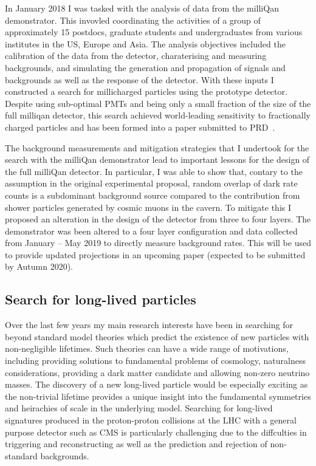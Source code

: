 \documentclass[11pt]{article}
\theoremstyle{plain} \numberwithin{equation}{section}
\theoremstyle{definition}
\begin{document}
In January 2018 I was tasked with the analysis of data from the 
milliQan demonstrator. This invovled coordinating the activities of a group of approximately
15 postdocs, graduate students and undergraduates from various institutes in the US, Europe and Asia. 
The analysis objectives included the calibration of the data from the detector,
charaterising and measuring backgrounds, and simulating the generation and propagation of 
signals and backgrounds as well as the response of the detector. With these inputs I constructed
a search for millicharged particles using the prototype detector. Despite using sub-optimal PMTs 
and being only a small fraction of the size of the full milliqan detector,
this search achieved world-leading sensitivity to fractionally charged particles and has been formed
into a paper submitted to PRD~\cite{XX}.

The background measurements and mitigation strategies that I undertook for the search
with the milliQan demonstrator lead to important lessons for the design 
of the full milliQan detector. In particular, I was able to show 
that, contary to the assumption in the original experimental proposal, random overlap of dark rate counts
is a subdominant background source compared to the contribution from shower particles generated
by cosmic muons in the cavern. To mitigate this I proposed an alteration in the design of the detector from
three to four layers. The demonstrator was been altered to a four layer configuration and data collected from 
January -- May 2019 to directly measure background rates. This will be used to provide updated
projections in an upcoming paper (expected to be submitted by Autumn 2020).

\subsection*{Search for long-lived particles}

Over the last few years my main research interests have been in searching for 
beyond standard model theories which predict the existence of new particles
with non-negligible lifetimes. Such theories can have a wide range of motivations, 
including providing solutions to fundamental problems of cosmology, naturalness considerations,
providing a dark matter candidate and allowing non-zero neutrino masses. The discovery
of a new long-lived particle would be especially exciting as the non-trivial lifetime
provides a unique insight into the fundamental symmetries and heirachies of scale in the underlying model.
Searching for long-lived signatures produced in the proton-proton collisions at the LHC
with a general purpose detector such as CMS is particularly 
challenging due to the diffculties in triggering and reconstructing as well as
the prediction and rejection of non-standard backgrounds. 
\end{document}
